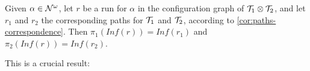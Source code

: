 \begin{theorem}
Given $\alpha \in \mathcal{N}^\omega$, let $r$ be a run for $\alpha$ in the configuration graph of $\mathcal{T}_1 \otimes \mathcal{T}_2$, and let $r_1$ and $r_2$ the corresponding paths for $\mathcal{T}_1$ and $\mathcal{T}_2$, according to \cref{cor:paths-correspondence}. Then $\pi_1(Inf(r)) = Inf(r_1)$ and $\pi_2(Inf(r)) = Inf(r_2)$.
\end{theorem}
%
This is a crucial result:




